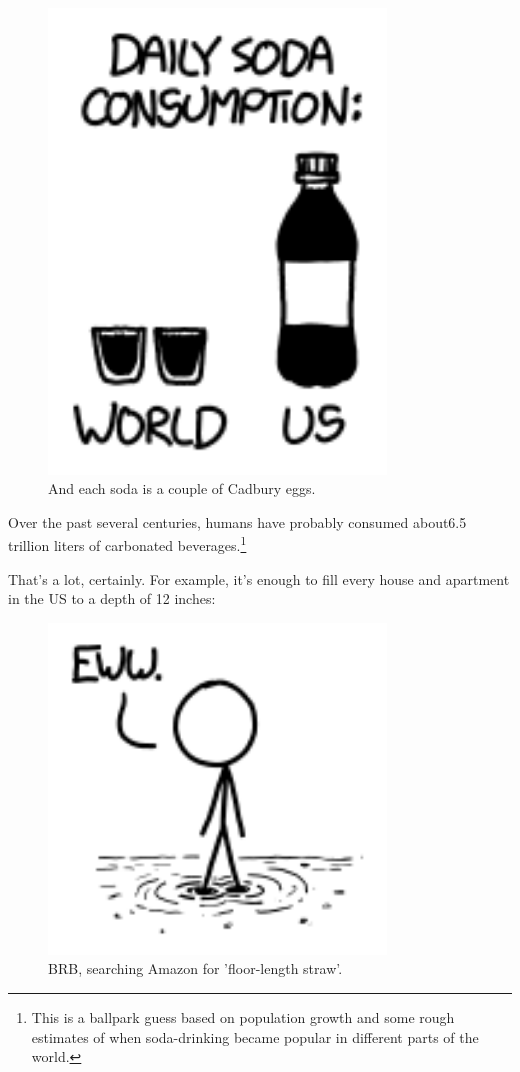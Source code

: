 {\begin{figure}[!htbp]
\centering
\includegraphics[scale=0.5, max width=0.8\textwidth]{imgs/a/74/soda_usworld.png}
\caption{And each soda is a couple of Cadbury eggs.}
\end{figure}

{Over the past several centuries, humans have probably consumed about6.5 trillion liters of carbonated beverages.{\footnote{This is a ballpark guess based on population growth and some rough estimates of when soda-drinking became popular in different parts of the world.} } }

{That's a lot, certainly. For example, it's enough to fill every house and apartment in the US to a depth of 12 inches:}

\begin{figure}[!htbp]
\centering
\includegraphics[scale=0.5, max width=0.8\textwidth]{imgs/a/74/soda_floor.png}
\caption{BRB, searching Amazon for 'floor-length straw'.}
\end{figure}

}
